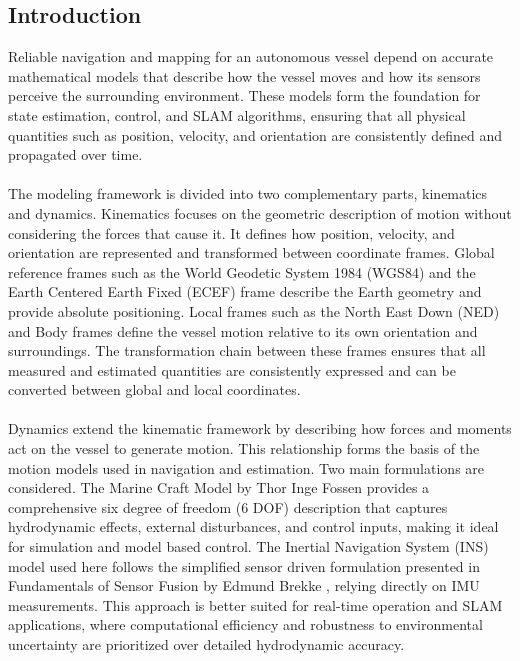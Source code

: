 \subsection{Introduction}
Reliable navigation and mapping for an autonomous vessel depend on accurate mathematical models that describe how the vessel moves and how its sensors perceive the surrounding environment. These models form the foundation for state estimation, control, and SLAM algorithms, ensuring that all physical quantities such as position, velocity, and orientation are consistently defined and propagated over time.  
\\ \\
The modeling framework is divided into two complementary parts, kinematics and dynamics. Kinematics focuses on the geometric description of motion without considering the forces that cause it. It defines how position, velocity, and orientation are represented and transformed between coordinate frames. Global reference frames such as the World Geodetic System 1984 (WGS84) and the Earth Centered Earth Fixed (ECEF) frame describe the Earth geometry and provide absolute positioning. Local frames such as the North East Down (NED) and Body frames define the vessel motion relative to its own orientation and surroundings. The transformation chain between these frames ensures that all measured and estimated quantities are consistently expressed and can be converted between global and local coordinates.
\\ \\
Dynamics extend the kinematic framework by describing how forces and moments act on the vessel to generate motion. This relationship forms the basis of the motion models used in navigation and estimation. Two main formulations are considered. The Marine Craft Model by Thor Inge Fossen \cite{fossen_marine_craft_model} provides a comprehensive six degree of freedom (6 DOF) description that captures hydrodynamic effects, external disturbances, and control inputs, making it ideal for simulation and model based control. The Inertial Navigation System (INS) model used here follows the simplified sensor driven formulation presented in Fundamentals of Sensor Fusion by Edmund Brekke \cite{sensor_fusion_book}, relying directly on IMU measurements. This approach is better suited for real-time operation and SLAM applications, where computational efficiency and robustness to environmental uncertainty are prioritized over detailed hydrodynamic accuracy.
\\ \\

